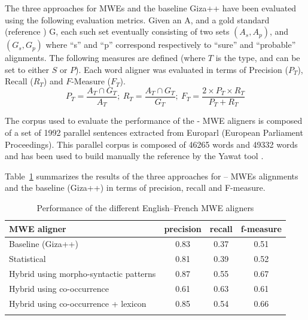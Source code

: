 \documentclass[output=paper,modfonts,nonflat]{langsci/langscibook}
\begin{document}
The three approaches for MWEs  and the baseline Giza++ \citep{och2000improved} have been evaluated using the following evaluation metrics. 
Given an  A, and a gold standard  (reference ) G, each such  set eventually consisting of two sets $(A_s, A_p)$, and $(G_s, G_p)$ where ``s'' and ``p'' correspond respectively to ``sure'' and ``probable'' alignments. 
The following measures are defined (where $T$ is the  type, and can be set to either $S$ or $P$). Each word aligner was evaluated in terms of Precision ($P_T$), Recall ($R_T$) and $F$-Measure ($F_T$).
\begin{equation}
P_T=\frac{A_T \cap G_T}{A_T} ;~
R_T=\frac{A_T \cap G_T}{G_T} ;~
F_T=\frac{2 \times P_T \times R_T}{P_T + R_T}
\label{sem:equa:PRF}
\end{equation}

The corpus used to evaluate the performance of the - MWE aligners is composed of a set of 1992 parallel sentences extracted from Europarl (European Parliament Proceedings). This parallel corpus is composed of 46265  words and 49332  words and has been used to build manually the reference  by the Yawat tool \citep{germann-2008-yawat}. %

Table~\ref{sem:tab:resultsPRF_en-fr} summarizes the results of the three approaches for -- MWEs alignments and the baseline (Giza++) in terms of precision, recall and F-measure. %

\begin{table}
\caption{Performance of the different English--French MWE aligners}
\label{sem:tab:resultsPRF_en-fr}
 \begin{tabular}{p{6.5cm}ccc}
  \lsptoprule
            \textnormal{MWE aligner} & \textnormal{precision} & \textnormal{recall} & \textnormal{f-measure} \\
  \midrule
Baseline (Giza++) & 0.83 & 0.37 & 0.51 \\
Statistical & 0.81 & 0.39 & 0.52 \\
Hybrid using morpho-syntactic patterns & 0.87 & 0.55 & 0.67 \\
Hybrid using co-occurrence & 0.61 & 0.63 & 0.61 \\
Hybrid using co-occurrence + lexicon & 0.85 & 0.54 & 0.66 \\
  \lspbottomrule
 \end{tabular}
\end{table}
\end{document}
